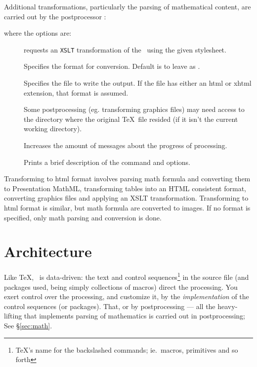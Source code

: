 \documentclass{article}
\begin{document}
Additional transformations, particularly the parsing of mathematical content, are carried out
by the postprocessor :
\begin{quote}
\end{quote}
where the options are:
\begin{description}
\item[] requests an \texttt{XSLT} transformation of
    the \XML\  using the given stylesheet.
\item[]  Specifies the format for conversion. Default
    is to leave as \XML.
\item[]  Specifies the file to write the output.
    If the file has either an html or xhtml extension, that format is assumed.
\item[] Some postprocessing (eg. transforming graphics files)
     may need access to the directory  where the original \TeX\ file resided 
     (if it isn't the current working directory).
\item[] Increases the amount of messages about the progress of processing.
\item[] Prints a brief description of the command and options.
\end{description}
Transforming to html format involves parsing math formula and converting them to Presentation MathML,
transforming tables into an HTML consistent format, converting graphics files and applying 
an XSLT transformation.
Transforming to html format is similar, but math formula are converted to images.
If no format is specified, only math parsing and conversion is done.

\section{Architecture}\label{sec:architecture}
Like \TeX, \LaTeXML\ is data-driven: the text and control sequences\footnote{\TeX's name
for the backslashed commands; ie.~macros, primitives and so forth}
in the source file (and packages used, being simply collections of macros)
direct the processing.
You exert control over the processing, and customize it, by 
the \emph{implementation} of the control sequences (or packages).
That, or by postprocessing --- all the heavy-lifting that implements parsing 
of mathematics is carried out in postprocessing; See \S\ref{sec:math}.
\end{document}
